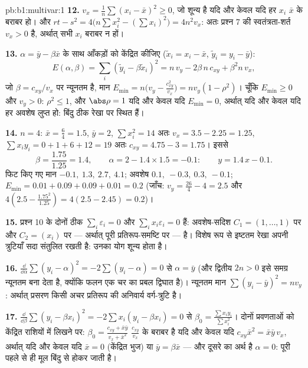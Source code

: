 \begin{solution}{pb:b1:multivar:1}
\textbf{12.} $v_x = \frac1n\sum(x_i - \bar x)^2 \geq 0$, जो शून्य है यदि
और केवल यदि हर $x_i$ $\bar x$ के बराबर हो। और $rt - s^2 = 4\bigl(n\sum
x_i^2 - (\sum x_i)^2\bigr) = 4n^2 v_x$: अतः प्रश्न 7 की स्वतंत्रता-शर्त
$v_x > 0$ है, अर्थात् सभी $x_i$ बराबर न हों।

\textbf{13.} $\alpha = \bar y - \beta\bar x$ के साथ आँकड़ों को केंद्रित
कीजिए ($\tilde x_i = x_i - \bar x$, $\tilde y_i = y_i - \bar y$):
\[
E(\alpha, \beta) = \sum_i(\tilde y_i - \beta\tilde x_i)^2
= n\,v_y - 2\beta\,n\,c_{xy} + \beta^2 n\,v_x ,
\]
जो $\beta = c_{xy}/v_x$ पर न्यूनतम है, मान $E_{\min} = n\bigl(v_y -
\frac{c_{xy}^2}{v_x}\bigr) = n v_y(1 - \rho^2)$। चूँकि $E_{\min} \geq 0$
और $v_y > 0$: $\rho^2 \leq 1$, और $\abs\rho = 1$ यदि और केवल यदि $E_{\min}
= 0$, अर्थात् यदि और केवल यदि हर अवशेष लुप्त हो: बिंदु ठीक रेखा पर स्थित
हैं।

\textbf{14.} $n = 4$: $\bar x = \frac64 = 1.5$, $\bar y = 2$, $\sum x_i^2
= 14$ अतः $v_x = 3.5 - 2.25 = 1.25$, $\sum x_iy_i = 0 + 1 + 6 + 12 = 19$
अतः $c_{xy} = 4.75 - 3 = 1.75$। इससे
\[
\beta = \frac{1.75}{1.25} = 1.4,
\qquad
\alpha = 2 - 1.4\times1.5 = -0.1 :
\qquad y = 1.4\,x - 0.1 .
\]
फिट किए गए मान $-0.1,\ 1.3,\ 2.7,\ 4.1$; अवशेष $0.1,\ -0.3,\ 0.3,\ -0.1$;
$E_{\min} = 0.01 + 0.09 + 0.09 + 0.01 = 0.2$ (जाँच: $v_y = \frac{26}4 - 4
= 2.5$ और $4(2.5 - \frac{1.75^2}{1.25}) = 4(2.5 - 2.45) = 0.2$)।

\textbf{15.} प्रश्न 10 के दोनों  ठीक $\sum_i\varepsilon_i
= 0$ और $\sum_i x_i\varepsilon_i = 0$ हैं: अवशेष-सदिश $C_1 = (1, \dots,
1)$ पर और $C_2 = (x_i)$ पर --- अर्थात् पूरी प्रतिरूप-समष्टि पर --- 
है। विशेष रूप से इष्टतम रेखा अपनी त्रुटियाँ सदा संतुलित रखती है: उनका योग
शून्य होता है।

\textbf{16.} $\frac{\dd}{\dd\alpha}\sum(y_i - \alpha)^2 = -2\sum(y_i -
\alpha) = 0$ से $\alpha = \bar y$ (और द्वितीय  $2n > 0$ इसे समग्र
न्यूनतम बना देता है, क्योंकि फलन एक चर का प्रबल द्विघात है)। न्यूनतम मान
$\sum(y_i - \bar y)^2 = n v_y$: अर्थात् प्रसरण किसी अचर प्रतिरूप की
अनिवार्य वर्ग-त्रुटि है।

\textbf{17.} $\frac{\dd}{\dd\beta}\sum(y_i - \beta x_i)^2 = -2\sum x_i(y_i
- \beta x_i) = 0$ से $\beta_0 = \frac{\sum x_iy_i}{\sum x_i^2}$। दोनों
प्रवणताओं को केंद्रित राशियों में लिखने पर: $\beta_0 = \frac{c_{xy} + \bar
x\bar y}{v_x + \bar x^2}$ $\frac{c_{xy}}{v_x}$ के बराबर है यदि और केवल यदि
$c_{xy}\bar x^2 = \bar x\bar y\,v_x$, अर्थात् यदि और केवल यदि $\bar x = 0$
(केंद्रित भुज) या $\bar y = \beta\bar x$ --- और दूसरे का अर्थ है $\alpha =
0$: पूरी  पहले से ही मूल बिंदु से होकर जाती है।


\end{solution}
